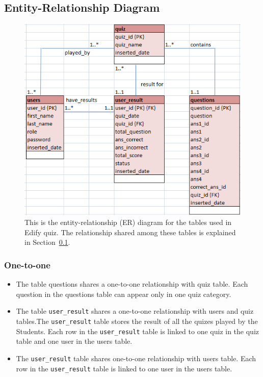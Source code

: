 \subsection{Entity-Relationship Diagram}
\label{sub:entity_relationship_diagram}

\begin{figure}[htpb]
	\centering
	\includegraphics[width=0.8\linewidth]{img/Entity_Relationship_Diagram.png}
	\caption{This is the entity-relationship (ER) diagram for the tables used
	in Edify quiz. The relationship shared among these tables is explained in
	Section~\ref{sub:entity_relationship_diagram}.
	}\label{fig:entity_relationship_diagram}
\end{figure}

\subsubsection{One-to-one}
\label{ssub:One-to-one}
\begin{itemize}

	\item The table questions shares a one-to-one relationship with quiz table.
		Each question in the questions table can appear only in one quiz
		category.

	\item The table \verb+user_result+ shares a one-to-one relationship with
		users and quiz tables.The \verb+user_result+ table stores the result of
		all the quizes played by the Students. Each row in the
		\verb+user_result+ table is linked to one quiz in the quiz table and
		one user in the users table.

	\item The \verb+user_result+ table shares one-to-one relationship with
		users table. Each row in the \verb+user_result+ table is linked to one
		user in the users table.

\end{itemize}

